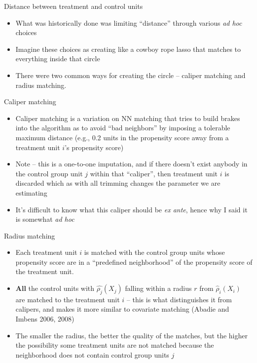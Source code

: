 \documentclass{beamer}
\begin{document}
\begin{frame}{Distance between treatment and control units}

\begin{itemize}
\item What was historically done was limiting ``distance''  through various \emph{ad hoc} choices
\item Imagine these choices as creating like a cowboy rope lasso that matches to everything inside that circle
\item There were two common ways for creating the circle -- caliper matching and radius matching. 
\end{itemize}

\end{frame}

\begin{frame}{Caliper matching}
	
	\begin{itemize}
	\item Caliper matching is a variation on NN matching that tries to build brakes into the algorithm as to avoid ``bad neighbors'' by imposing a tolerable maximum distance (e.g., 0.2 units in the propensity score away from a treatment unit $i$'s propensity score)
	\item Note -- this is a one-to-one imputation, and if there doesn't exist anybody in the control group unit $j$ within that ``caliper'', then treatment unit $i$ is discarded which as with all trimming changes the parameter we are estimating
	\item It's difficult to know what this caliper should be \emph{ex ante}, hence why I said it is somewhat \emph{ad hoc}
	\end{itemize}

\end{frame}


\begin{frame}{Radius matching}
	
	
		\begin{itemize}
		\item Each treatment unit $i$ is matched with the control group units whose propensity score are in a ``predefined neighborhood'' of the propensity score of the treatment unit.
		\item \textbf{All} the control units with $\widehat{\rho_j}(X_{j})$ falling within a radius $r$ from $\widehat{\rho}_i(X_i)$ are matched to the treatment unit $i$ -- this is what distinguishes it from calipers, and makes it more similar to covariate matching (Abadie and Imbens 2006, 2008)
		\item The smaller the radius, the better the quality of the matches, but the higher the possibility some treatment units are not matched because the neighborhood does not contain control group units $j$
		\end{itemize}
		
\end{frame}
\end{document}
